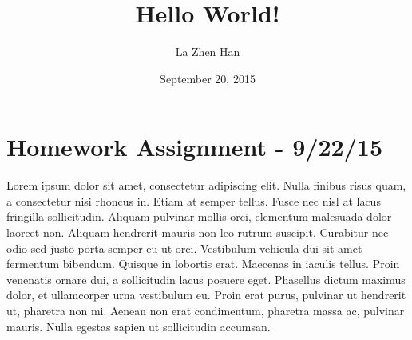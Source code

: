 \documentclass{article}
\begin{document}
	
	\title{Hello World!}
	\author{La Zhen Han}
	\date{September 20, 2015}
	
	\maketitle
	
	\section{Homework Assignment - 9/22/15}
	Lorem ipsum dolor sit amet, consectetur adipiscing elit. Nulla finibus risus quam, a consectetur nisi rhoncus in. Etiam at semper tellus. Fusce nec nisl at lacus fringilla sollicitudin. Aliquam pulvinar mollis orci, elementum malesuada dolor laoreet non. Aliquam hendrerit mauris non leo rutrum suscipit. Curabitur nec odio sed justo porta semper eu ut orci. Vestibulum vehicula dui sit amet fermentum bibendum. Quisque in lobortis erat. Maecenas in iaculis tellus. Proin venenatis ornare dui, a sollicitudin lacus posuere eget. Phasellus dictum maximus dolor, et ullamcorper urna vestibulum eu. Proin erat purus, pulvinar ut hendrerit ut, pharetra non mi. Aenean non erat condimentum, pharetra massa ac, pulvinar mauris. Nulla egestas sapien ut sollicitudin accumsan.
	
\end{document}
